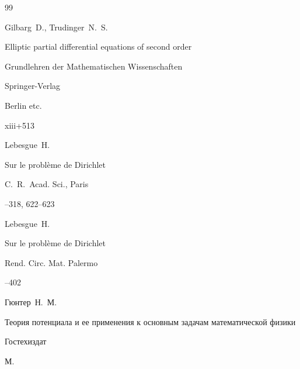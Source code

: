 \begin{thebibliography}{99}

\by Gilbarg~D., Trudinger~N.~S.

\book Elliptic partial differential equations of second order

\serial Grundlehren der Mathematischen Wissenschaften



\publ Springer-Verlag

\publaddr Berlin etc.

\totalpages xiii+513







\by Lebesgue~H.

\paper Sur le probl\`eme de Dirichlet

\jour C.~R.~Acad. Sci.\rm, Paris



--318, 622--623


\moreref

\by Lebesgue~H.

\paper Sur le probl\`eme de Dirichlet

\jour Rend. Circ. Mat. Palermo



--402







\by Гюнтер~Н.~М.

\book Теория потенциала и ее применения к основным задачам математической физики


\publ Гостехиздат

\publaddr М.





\end{thebibliography}
